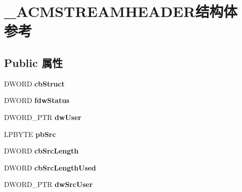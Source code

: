 \hypertarget{struct___a_c_m_s_t_r_e_a_m_h_e_a_d_e_r}{}\section{\+\_\+\+A\+C\+M\+S\+T\+R\+E\+A\+M\+H\+E\+A\+D\+E\+R结构体 参考}
\label{struct___a_c_m_s_t_r_e_a_m_h_e_a_d_e_r}
\subsection*{Public 属性}
\begin{DoxyCompactItemize}
\item 
\mbox{\label{struct___a_c_m_s_t_r_e_a_m_h_e_a_d_e_r_a497f416ba1c8fece775967d65706fa4c}} 
D\+W\+O\+RD {\bfseries cb\+Struct}
\item 
\mbox{\label{struct___a_c_m_s_t_r_e_a_m_h_e_a_d_e_r_a1247018c11efbf5ea3678e4acfee43b1}} 
D\+W\+O\+RD {\bfseries fdw\+Status}
\item 
\mbox{\label{struct___a_c_m_s_t_r_e_a_m_h_e_a_d_e_r_a826ccf6343c9684e08e9bbd2b9e196d7}} 
D\+W\+O\+R\+D\+\_\+\+P\+TR {\bfseries dw\+User}
\item 
\mbox{\label{struct___a_c_m_s_t_r_e_a_m_h_e_a_d_e_r_ae69a74807d17f3185da1e5def31c6b7b}} 
L\+P\+B\+Y\+TE {\bfseries pb\+Src}
\item 
\mbox{\label{struct___a_c_m_s_t_r_e_a_m_h_e_a_d_e_r_ab0e4b4052544896e17ab1e771c5107af}} 
D\+W\+O\+RD {\bfseries cb\+Src\+Length}
\item 
\mbox{\label{struct___a_c_m_s_t_r_e_a_m_h_e_a_d_e_r_a1f41a65d7223ee4fd8aec422880977d1}} 
D\+W\+O\+RD {\bfseries cb\+Src\+Length\+Used}
\item 
\mbox{\label{struct___a_c_m_s_t_r_e_a_m_h_e_a_d_e_r_aff698ee56f087d7f78d04401f303ed8d}} 
D\+W\+O\+R\+D\+\_\+\+P\+TR {\bfseries dw\+Src\+User}
\item 
\mbox{\label{struct___a_c_m_s_t_r_e_a_m_h_e_a_d_e_r_a7b3c0be6de7d6320e43e14df4ac052c9}} 

\end{DoxyCompactItemize}
